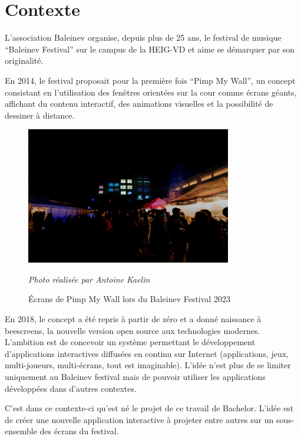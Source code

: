 \section{Contexte}
L'association Baleinev organise, depuis plus de 25 ans, le festival de musique “Baleinev Festival” sur le campus de la HEIG-VD et aime se démarquer par son originalité.

En 2014, le festival proposait pour la première fois “Pimp My Wall”, un concept consistant en l'utilisation des fenêtres orientées sur la cour comme écrans géants, affichant du contenu interactif, des animations visuelles et la possibilité de dessiner à distance.

\begin{figure}[H]
  \centering
  \includegraphics[width=0.8\textwidth]{assets/figures/pmw-ak.jpg}
  \begin{center}
    \textit{Photo réalisée par Antoine Kaelin}
  \end{center}
  \caption{Écrans de Pimp My Wall lors du Baleinev Festival 2023}
  \label{fig:pmw-baleinev-2023}
\end{figure}

En 2018, le concept a été repris à partir de zéro et a donné naissance à \gls{beescreens}, la nouvelle version open source aux technologies modernes. L'ambition est de concevoir un système permettant le développement d'applications interactives diffusées en continu sur Internet (applications, jeux, multi-joueurs, multi-écrans, tout est imaginable). L'idée n'est plus de se limiter uniquement au Baleinev festival mais de pouvoir utiliser les applications développées dans d'autres contextes.

C'est dans ce contexte-ci qu'est né le projet de ce travail de Bachelor. L'idée est de créer une nouvelle application interactive à projeter entre autres sur un sous-ensemble des écrans du festival.

